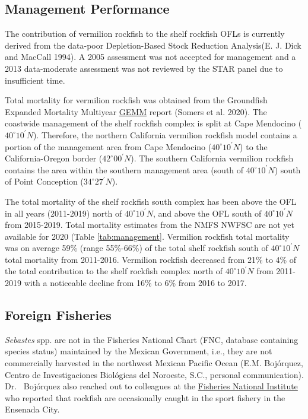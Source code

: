 \documentclass[
  english,
  a4paper,
]{article}
\begin{document}
\hypertarget{management-performance-1}{%
\subsection{Management Performance}\label{management-performance-1}}

The contribution of vermilion rockfish to the shelf rockfish OFLs is currently derived from
the data-poor Depletion-Based Stock Reduction Analysis(E. J. Dick and MacCall 1994). A 2005
assessment was not accepted for management and a 2013 data-moderate assessment
was not reviewed by the STAR panel due to insufficient time.

Total mortality for vermilion rockfish was obtained from the Groundfish Expanded Mortality
Multiyear \href{https://www.nwfsc.noaa.gov/data/api/v1/source/observer.gemm_fact/selection.xlsx}{GEMM}
report (Somers et al. 2020). The coastwide management of the shelf rockfish complex is split at Cape
Mendocino ($40^\circ 10^\prime N$). Therefore, the northern California vermilion rockfish
model contains a portion of the management area from Cape Mendocino ($40^\circ 10^\prime N$)
to the California-Oregon border ($42^\circ 00^\prime N$). The southern California vermilion rockfish contains the
area within the southern management area (south of $40^\circ 10^\prime N$) south of Point Conception ($34^\circ 27^\prime N$).

The total mortality of the shelf rockfish
south complex has been above the OFL in all years (2011-2019) north of $40^\circ 10^\prime N$, and
above the OFL south of $40^\circ 10^\prime N$ from 2015-2019. Total mortality
estimates from the NMFS NWFSC are not yet available for 2020 (Table \ref{tab:management}. Vermilion rockfish total
mortality was on average 59\% (range 55\%-66\%) of the total shelf rockfish south
of $40^\circ 10^\prime N$ total mortality from 2011-2016. Vermilion rockfish decreased from 21\% to 4\% of
the total contribution to the shelf rockfish complex north of $40^\circ 10^\prime N$ from 2011-2019 with a
noticeable decline from 16\% to 6\% from 2016 to 2017.

\hypertarget{foreign-fisheries}{%
\subsection{Foreign Fisheries}\label{foreign-fisheries}}

\emph{Sebastes} spp. are not in the Fisheries National Chart (FNC, database containing
species status) maintained by the Mexican Government, i.e., they are not commercially
harvested in the northwest Mexican Pacific Ocean (E.M. Bojórquez, Centro de
Investigaciones Biológicas del Noroeste, S.C., personal communication). Dr.~
Bojórquez also reached out to colleagues at the
\href{https://www.gob.mx/inapesca}{Fisheries National Institute} who reported that rockfish
are occasionally caught in the sport fishery in the Ensenada City.
\end{document}
